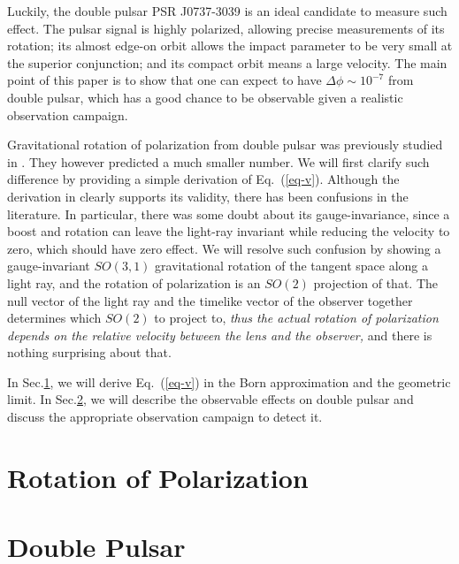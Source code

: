 \documentclass[aps,showpacs,twocolumn,floats,prd,superscriptaddress,nofootinbib]{revtex4}
\begin{document}
Luckily, the double pulsar PSR J0737-3039 is an ideal candidate to measure such effect. The pulsar signal is highly polarized, allowing precise measurements of its rotation; its almost edge-on orbit allows the impact parameter to be very small at the superior conjunction; and its compact orbit means a large velocity. The main point of this paper is to show that one can expect to have $\Delta\phi\sim 10^{-7}$ from double pulsar, which has a good chance to be observable given a realistic observation campaign.

Gravitational rotation of polarization from double pulsar was previously studied in \cite{RugTar06}. They however predicted a much smaller number. We will first clarify such difference by providing a simple derivation of Eq.~(\ref{eq-v}). Although the derivation in \cite{KopMas01} clearly supports its validity, there has been confusions in the literature. In particular, there was some doubt about its gauge-invariance, since a boost and rotation can leave the light-ray invariant while reducing the velocity to zero, which should have zero effect. We will resolve such confusion by showing a gauge-invariant $SO(3,1)$ gravitational rotation of the tangent space along a light ray, and the rotation of polarization is an $SO(2)$ projection of that. The null vector of the light ray and the timelike vector of the observer together determines which $SO(2)$ to project to, {\it thus the actual rotation of polarization depends on the relative velocity between the lens and the observer,} and there is nothing surprising about that.

In Sec.\ref{sec-born}, we will derive Eq.~(\ref{eq-v}) in the Born approximation and the geometric limit. In Sec.\ref{sec-prediction}, we will describe the observable effects on double pulsar and discuss the appropriate observation campaign to detect it.

\section{Rotation of Polarization}
\label{sec-born}

\section{Double Pulsar}
\label{sec-prediction}


\end{document}
